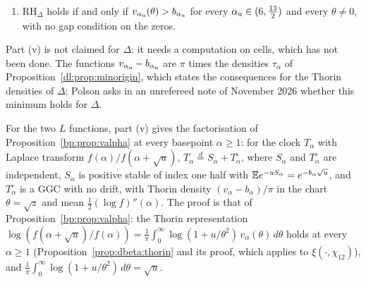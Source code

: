 \begin{remark}
\begin{enumerate}
\item[(vi$_\Delta$)] $\mathrm{RH}_\Delta$ holds if and only if $v_{\alpha_{\rm u}}(\theta)>b_{\alpha_{\rm u}}$ for every $\alpha_{\rm u}\in(6,\frac{13}2)$ and every $\theta\ne0$, with no gap condition on the zeros.
\end{enumerate}
Part (v) is not claimed for $\Delta$: it needs a computation on cells, which has not been done. The functions $v_{\alpha_{\rm u}}-b_{\alpha_{\rm u}}$ are $\pi$ times the densities $\tau_\alpha$ of Proposition~\ref{dl:prop:minorigin}, which states the consequences for the Thorin densities of $\Delta$; Polson asks in an unrefereed note of November 2026 whether this minimum holds for $\Delta$.
\end{remark}

For the two $L$ functions, part (v) gives the factorisation of Proposition~\ref{bp:prop:valpha} at every basepoint $\alpha\ge1$: for the clock $T_\alpha$ with Laplace transform $f(\alpha)/f(\alpha+\sqrt u)$, $T_\alpha\stackrel d=S_\alpha+T_\alpha^\circ$, where $S_\alpha$ and $T_\alpha^\circ$ are independent, $S_\alpha$ is positive stable of index one half with $\mathbb{E} e^{-uS_\alpha}=e^{-b_\alpha\sqrt u}$, and $T_\alpha^\circ$ is a GGC with no drift, with Thorin density $(v_\alpha-b_\alpha)/\pi$ in the chart $\theta=\sqrt z$ and mean $\frac12(\log f)''(\alpha)$. The proof is that of Proposition~\ref{bp:prop:valpha}: the Thorin representation $\log(f(\alpha+\sqrt u)/f(\alpha))=\frac1\pi\int_0^\infty\log(1+u/\theta^2)\,v_\alpha(\theta)\,d\theta$ holds at every $\alpha\ge1$ (Proposition~\ref{prop:dbeta:thorin} and its proof, which applies to $\xi(\cdot,\chi_{12})$), and $\frac1\pi\int_0^\infty\log(1+u/\theta^2)\,d\theta=\sqrt u$.

